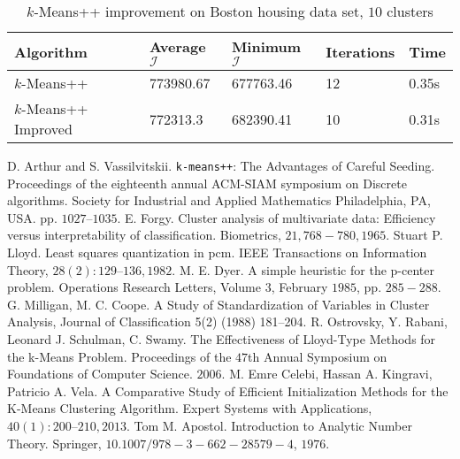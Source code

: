 \documentclass[twoside, 11pt]{article}
\newcommand{\I}{\mathcal{I}}
\begin{document}
		\begin{table}
			\begin{center}
				\begin{tabular}{|l|l|l|l|l|}
					\hline
					Algorithm & Average $\I$& Minimum $\I$& Iterations & Time\\\hline
					$k$-Means++ & 773980.67& 677763.46& 12& 0.35s\\\hline
					$k$-Means++ Improved& 772313.3& 682390.41& 10& 0.31s\\\hline
				\end{tabular}
				\caption{$k$-Means++ improvement on Boston housing data set, $10$ clusters}
				\label{tbl:boston2}
			\end{center}
		\end{table}
	\begin{thebibliography}{99}
		 D. Arthur and S. Vassilvitskii. \texttt{k-means++}: The Advantages of Careful Seeding. Proceedings of the eighteenth annual ACM-SIAM symposium on Discrete algorithms. Society for Industrial and Applied Mathematics Philadelphia, PA, USA. pp. $1027–1035$.
		 E. Forgy. Cluster analysis of multivariate data: Efficiency versus interpretability of classification. Biometrics, $21, 768-780, 1965$.
		 Stuart P. Lloyd. Least squares quantization in pcm. IEEE Transactions on Information Theory, $28(2):129–136, 1982$.
		 M. E. Dyer. A simple heuristic for the p-center problem. Operations Research Letters, Volume $3$, February $1985$, pp. $285-288$.
		 G. Milligan, M. C. Coope. A Study of Standardization of Variables in Cluster Analysis, Journal of Classification 5(2) (1988) 181–204.
		 R. Ostrovsky, Y. Rabani, Leonard J. Schulman, C. Swamy. The Effectiveness of Lloyd-Type Methods for the k-Means Problem. Proceedings of the $47$th Annual Symposium on Foundations of Computer Science. $2006$.
		 M. Emre Celebi, Hassan A. Kingravi, Patricio A. Vela. A Comparative Study of Efficient Initialization Methods for the K-Means Clustering Algorithm. Expert Systems with Applications, $40(1): 200–210, 2013$.
		 Tom M. Apostol. Introduction to Analytic Number Theory. Springer, $10.1007/978-3-662-28579-4$, $1976$.
	\end{thebibliography}
\end{document}
